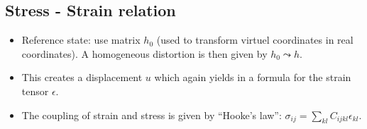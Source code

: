 \documentclass{scrartcl}
\begin{document}
\subsection{Stress - Strain relation}

\begin{itemize}
\item Reference state: use matrix \(h_0\) (used to transform virtuel
  coordinates in real coordinates). A homogeneous distortion is then
  given by \(h_0 \leadsto h\).
\item This creates a displacement \(u\) which again yields in a
  formula for the strain tensor \(\epsilon\).
\item The coupling of strain and stress is given by ``Hooke's law'':
  \(\sigma_{ij} = \sum_{kl} C_{ijkl} \epsilon_{kl}\). 
\end{itemize}
\end{document}
